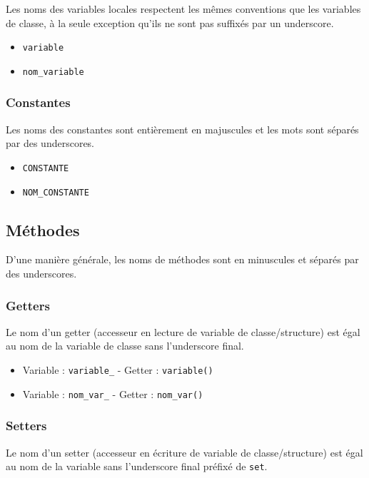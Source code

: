 \documentclass[]{article}
\begin{document}
Les noms des variables locales respectent les mêmes conventions 
que les variables de classe, à la seule exception qu’ils ne sont pas
suffixés par un underscore.

\begin{itemize}
	\item \texttt{variable}
	\item \texttt{nom\_variable}
\end{itemize}

\subsubsection{Constantes}

Les noms des constantes sont entièrement en majuscules et les mots sont
séparés par des underscores.

\begin{itemize}
	\item \texttt{CONSTANTE}
	\item \texttt{NOM\_CONSTANTE}
\end{itemize}

\subsection{Méthodes}

D'une manière générale, les noms de méthodes sont en minuscules et
séparés par des underscores.

\subsubsection{Getters}

Le nom d'un getter (accesseur en lecture de variable de classe/structure)
est égal au nom de la variable de classe sans l'underscore final.

\begin{itemize}
	\item Variable : \texttt{variable\_} - Getter : \texttt{variable()}
	\item Variable : \texttt{nom\_var\_} - Getter : \texttt{nom\_var()}
\end{itemize}

\subsubsection{Setters}

Le nom d'un setter (accesseur en écriture de variable de classe/structure)
est égal au nom de la variable sans l'underscore final préfixé de \texttt{set}.
\end{document}
